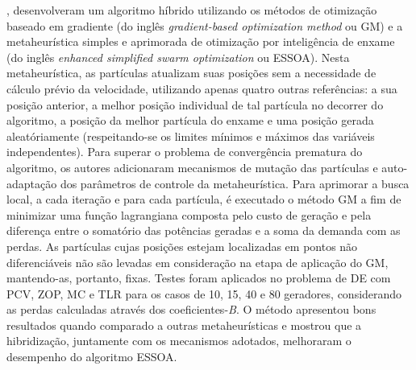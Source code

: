 \documentclass[
	12pt,				%
	openany,			%
	twoside,			%
	a4paper,			%
	chapter=TITLE,		%
	section=Title,		%
	subsection=Title,	%
	subsubsection=Title,%
	english,			%
	french,				%
	spanish,			%
	brazil			%
	]{abntex2}
\begin{document}
\begin{ERRATA}
, desenvolveram um algoritmo híbrido utilizando os métodos de otimização baseado em gradiente (do inglês \emph{gradient-based
optimization method} ou GM) e a metaheurística simples e aprimorada de otimização por inteligência de enxame (do inglês \emph{enhanced simplified swarm optimization} ou ESSOA). Nesta metaheurística, as partículas atualizam suas posições sem a necessidade de cálculo prévio da velocidade, utilizando apenas quatro outras referências: a sua posição anterior, a melhor posição individual de tal partícula no decorrer do algoritmo, a posição da melhor partícula do enxame e uma posição gerada aleatóriamente (respeitando-se os limites mínimos e máximos das variáveis independentes). Para superar o problema de convergência prematura do algoritmo, os autores adicionaram mecanismos de mutação das partículas e auto-adaptação dos parâmetros de controle da metaheurística. Para aprimorar a busca local, a cada iteração e para cada partícula, é executado o método GM a fim de minimizar uma função lagrangiana composta pelo custo de geração e pela diferença entre o somatório das potências geradas e a soma da demanda com as perdas. As partículas cujas posições estejam localizadas em pontos não diferenciáveis não são levadas em consideração na etapa de aplicação do GM, mantendo-as, portanto, fixas. Testes foram aplicados no problema de DE com PCV, ZOP, MC e TLR para os casos de 10, 15, 40 e 80 geradores, considerando as perdas calculadas através dos coeficientes-\emph{B}. O método apresentou bons resultados quando comparado a outras metaheurísticas e mostrou que a hibridização, juntamente com os mecanismos adotados, melhoraram o desempenho do algoritmo ESSOA.


\end{ERRATA}
\end{document}

